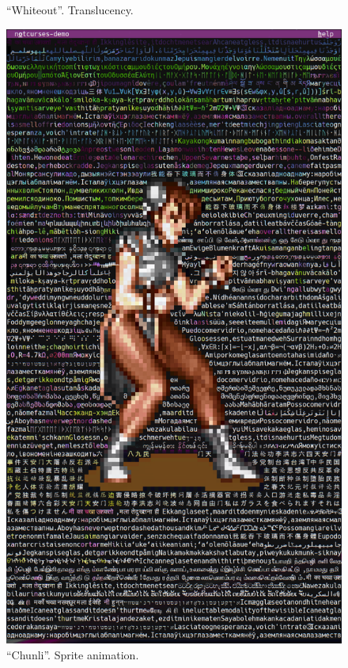 \documentclass[letterpaper,10pt]{article}
\begin{document}
\begin{figure}
\begin{minipage}{0.45\textwidth}
    \caption{``Whiteout''. Translucency.}
  \end{minipage}\hfill
\end{figure}

\begin{figure}
  \centering \includegraphics[width=.75\linewidth]{media/demo-chunli1.png}
  \caption{``Chunli''. Sprite animation.}
\end{figure}
\end{document}
